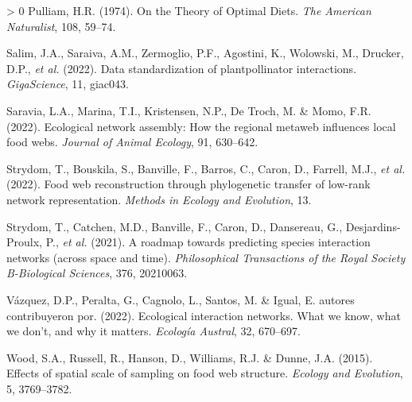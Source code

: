 \documentclass[11pt]{article}
\newlength{\cslhangindent}
\newenvironment{CSLReferences}[3] %
 {%
  \setlength{\parindent}{0pt}
  \ifodd #1 \everypar{\setlength{\hangindent}{\cslhangindent}}\ignorespaces\fi
  \ifnum #2 > 0
  \setlength{\parskip}{#2\baselineskip}
  \fi
 }%
 {}
\begin{document}
\begin{CSLReferences}{1}{0}
\leavevmode\hypertarget{ref-Pulliam1974Theory}{}%
Pulliam, H.R. (1974). On the Theory of Optimal Diets. \emph{The American
Naturalist}, 108, 59--74.

\leavevmode\hypertarget{ref-Salim2022DatSta}{}%
Salim, J.A., Saraiva, A.M., Zermoglio, P.F., Agostini, K., Wolowski, M.,
Drucker, D.P., \emph{et al.} (2022). Data standardization of
plantpollinator interactions. \emph{GigaScience}, 11, giac043.

\leavevmode\hypertarget{ref-Saravia2022Ecological}{}%
Saravia, L.A., Marina, T.I., Kristensen, N.P., De Troch, M. \& Momo,
F.R. (2022). Ecological network assembly: How the regional metaweb
influences local food webs. \emph{Journal of Animal Ecology}, 91,
630--642.

\leavevmode\hypertarget{ref-Strydom2022Food}{}%
Strydom, T., Bouskila, S., Banville, F., Barros, C., Caron, D., Farrell,
M.J., \emph{et al.} (2022). Food web reconstruction through phylogenetic
transfer of low-rank network representation. \emph{Methods in Ecology
and Evolution}, 13.

\leavevmode\hypertarget{ref-Strydom2021Roadmapa}{}%
Strydom, T., Catchen, M.D., Banville, F., Caron, D., Dansereau, G.,
Desjardins-Proulx, P., \emph{et al.} (2021). A roadmap towards
predicting species interaction networks (across space and time).
\emph{Philosophical Transactions of the Royal Society B-Biological
Sciences}, 376, 20210063.

\leavevmode\hypertarget{ref-VazquezSS2022EcoInt}{}%
Vázquez, D.P., Peralta, G., Cagnolo, L., Santos, M. \& Igual, E. autores
contribuyeron por. (2022). Ecological interaction networks. What we
know, what we don't, and why it matters. \emph{Ecología Austral}, 32,
670--697.

\leavevmode\hypertarget{ref-Wood2015Effects}{}%
Wood, S.A., Russell, R., Hanson, D., Williams, R.J. \& Dunne, J.A.
(2015). Effects of spatial scale of sampling on food web structure.
\emph{Ecology and Evolution}, 5, 3769--3782.

\end{CSLReferences}
\end{document}
